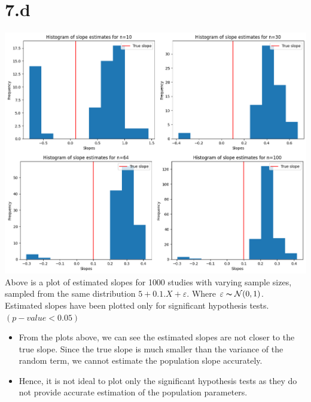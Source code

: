 \documentclass[12pt]{article}
\begin{document}
\section*{7.d}
\includegraphics*[width=\linewidth]{graph7d}
Above is a plot of estimated slopes for 1000 studies with varying sample sizes,
sampled from the same distribution \(5 + 0.1 . X + \varepsilon\). Where \(\varepsilon \thicksim \mathcal{N}(0, 1)\).
\\
Estimated slopes have been plotted only for significant hypothesis tests. \((p-value < 0.05)\)
\begin{itemize}
    \item From the plots above, we can see the estimated slopes are not closer
    to the true slope. Since the true slope is much smaller than the variance
    of the random term, we cannot estimate the population slope accurately.
    \item Hence, it is not ideal to plot only the significant hypothesis tests
    as they do not provide accurate estimation of the population parameters.
\end{itemize}
\end{document}
